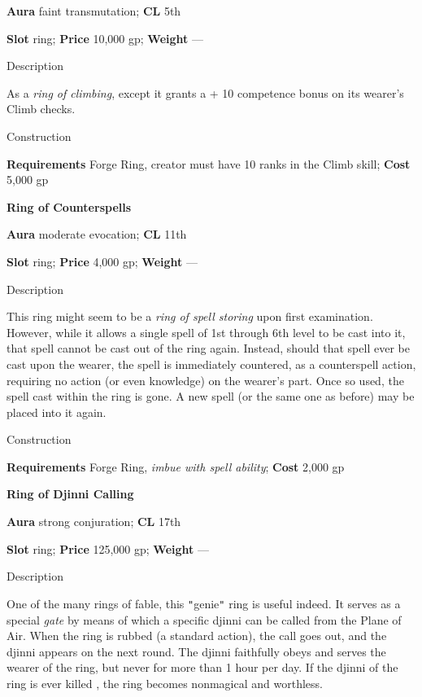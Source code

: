 \textbf{Aura} faint transmutation;\textbf{ CL }5th
				
\textbf{Slot} ring; \textbf{Price} 10,000 gp; \textbf{Weight} ---
				
Description
				
As a \textit{ring of climbing}, except it grants a +
10 competence
 bonus on its wearer's Climb checks. 
				
Construction
				
\textbf{Requirements} Forge Ring, creator must have 10 ranks in the Climb skill; \textbf{Cost }5,000 gp
				
\textbf{Ring of Counterspells}
				
\textbf{Aura} moderate evocation;\textbf{ CL }11th
				
\textbf{Slot} ring; \textbf{Price} 4,000 gp; \textbf{Weight} ---
				
Description
				
This ring might seem to be a \textit{ring of spell storing }upon first examination. However, while it allows a single spell of 
1st
 through 6th level to be cast into it, that spell cannot be cast out of the ring again. Instead, should that spell ever be cast upon the wearer, the spell is immediately countered, as a counterspell action, requiring no action (or even knowledge) on the wearer's part. Once so used, the spell cast within the ring is gone. A new spell (or the same one as before) 
may be placed
 into it again. 
				
Construction
				
\textbf{Requirements} Forge Ring, \textit{imbue with spell ability}; \textbf{Cost }2,000 gp
				
\textbf{Ring of Djinni Calling}
				
\textbf{Aura} strong conjuration;\textbf{ CL }17th
				
\textbf{Slot} ring; \textbf{Price} 125,000 gp; \textbf{Weight} ---
				
Description
				
One of the many rings of fable, this \texttt{{}"{}}genie\texttt{{}"{}} ring is useful indeed. It serves as a special \textit{gate }by means of which a specific djinni 
can be called
 from the Plane of Air. 
When the ring is rubbed (a standard action), the call goes out, and the djinni appears on the next round.
 The djinni faithfully obeys and serves the wearer of the ring, but never for more than 1 hour per day. If the djinni of the ring 
is ever killed
, the ring becomes nonmagical and worthless. 
				

